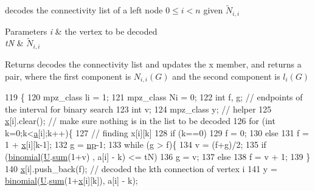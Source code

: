decodes the connectivity list of a left node $0 \leq i < n$ given $\tilde{N}_{i,i}$ 


\begin{DoxyParams}{Parameters}
{\em i} & the vertex to be decoded \\
\hline
{\em tN} & $\tilde{N}_{i,i}$ \\
\hline
\end{DoxyParams}
\begin{DoxyReturn}{Returns}
decodes the connectivity list and updates the x member, and returns a pair, where the first component is $N_{i,i}(G)$ and the second component is $l_{i}(G)$ 
\end{DoxyReturn}

\begin{DoxyCode}
119 \{
120   mpz\_class li = 1;
121   mpz\_class Ni = 0;
122   \textcolor{keywordtype}{int} f, g; \textcolor{comment}{// endpoints of the interval for binary search}
123   \textcolor{keywordtype}{int} v;
124   mpz\_class y; \textcolor{comment}{// helper}
125   \hyperlink{classb__graph__decoder_a6bba2e67984f9733fc60c40dd4956587}{x}[i].clear(); \textcolor{comment}{// make sure nothing is in the list to be decoded}
126   \textcolor{keywordflow}{for} (\textcolor{keywordtype}{int} k=0;k<\hyperlink{classb__graph__decoder_afcf783e4199fb8f9d6828db08bb12333}{a}[i];k++)\{
127     \textcolor{comment}{// finding x[i][k]}
128     \textcolor{keywordflow}{if} (k==0)
129       f = 0;
130     \textcolor{keywordflow}{else}
131       f = 1 + \hyperlink{classb__graph__decoder_a6bba2e67984f9733fc60c40dd4956587}{x}[i][k-1];
132     g = \hyperlink{classb__graph__decoder_a7eca48cf8793e722d1b29dbdc9fd2dca}{np}-1;
133     \textcolor{keywordflow}{while} (g > f)\{
134       v = (f+g)/2;
135       \textcolor{keywordflow}{if} (\hyperlink{compression__helper_8cpp_acecca9cb279d3b3d82915a07d67818cf}{binomial}(\hyperlink{classb__graph__decoder_ae15e74088bb60a096562a9bdaf380f2c}{U}.\hyperlink{classreverse__fenwick__tree_a672731fd6395b4853430073a099a80e6}{sum}(1+v) , a[i] - k) <= tN)
136         g = v;
137       \textcolor{keywordflow}{else}
138         f = v + 1;
139     \}
140     \hyperlink{classb__graph__decoder_a6bba2e67984f9733fc60c40dd4956587}{x}[i].push\_back(f); \textcolor{comment}{// decoded the kth connection of vertex i}
141     y = \hyperlink{compression__helper_8cpp_acecca9cb279d3b3d82915a07d67818cf}{binomial}(\hyperlink{classb__graph__decoder_ae15e74088bb60a096562a9bdaf380f2c}{U}.\hyperlink{classreverse__fenwick__tree_a672731fd6395b4853430073a099a80e6}{sum}(1+\hyperlink{classb__graph__decoder_a6bba2e67984f9733fc60c40dd4956587}{x}[i][k]), a[i] - k);

\end{DoxyCode}
